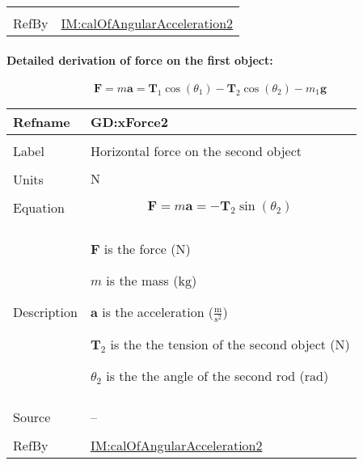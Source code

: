 \documentclass[12pt]{article}
\begin{document}
\begin{minipage}{\textwidth}
\begin{tabular}{>{\raggedright}p{}>{\raggedright\arraybackslash}p{}}
\\ \midrule \\
RefBy & \hyperref[IM:calOfAngularAcceleration2]{IM:calOfAngularAcceleration2}
        
\\ \bottomrule
\end{tabular}
\end{minipage}
\paragraph{Detailed derivation of force on the first object:}
\label{GD:yForce1Deriv}
\begin{displaymath}
\symbf{F}=m \symbf{a}={\symbf{T}_{1}} \cos\left({θ_{1}}\right)-{\symbf{T}_{2}} \cos\left({θ_{2}}\right)-{m_{1}} \symbf{g}
\end{displaymath}
\vspace{\baselineskip}
\noindent
\begin{minipage}{\textwidth}
\begin{tabular}{>{\raggedright}p{}>{\raggedright\arraybackslash}p{}}
\toprule \textbf{Refname} & \textbf{GD:xForce2}
\label{GD:xForce2}
\\ \midrule \\
Label & Horizontal force on the second object
        
\\ \midrule \\
Units & ${\text{N}}$
        
\\ \midrule \\
Equation & \begin{displaymath}
           \symbf{F}=m \symbf{a}=-{\symbf{T}_{2}} \sin\left({θ_{2}}\right)
           \end{displaymath}
\\ \midrule \\
Description & \begin{symbDescription}
              \item{$\symbf{F}$ is the force (${\text{N}}$)}
              \item{$m$ is the mass (${\text{kg}}$)}
              \item{$\symbf{a}$ is the acceleration ($\frac{\text{m}}{\text{s}^{2}}$)}
              \item{${\symbf{T}_{2}}$ is the the tension of the second object (${\text{N}}$)}
              \item{${θ_{2}}$ is the the angle of the second rod (${\text{rad}}$)}
              \end{symbDescription}
\\ \midrule \\
Source & --
         
\\ \midrule \\
RefBy & \hyperref[IM:calOfAngularAcceleration2]{IM:calOfAngularAcceleration2}
        
\\ \bottomrule
\end{tabular}
\end{minipage}
\end{document}
